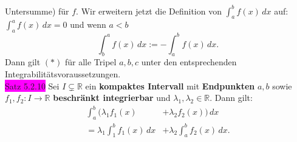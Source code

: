 \documentclass[landscape, 10pt]{article}
\newcommand{\R}{\mathbb{R}}
\begin{document}
\begin{multicols}{3}
{                     Untersumme)} für 
                     \textcolor{NavyBlue}{$f$}. Wir
                     erweitern jetzt die Definition von 
                     \textcolor{NavyBlue}{$\int_a^bf(x)\,dx$} 
                     auf: 
                     \textcolor{NavyBlue}{$\int_a^af(x)\,dx=0$} 
                     und wenn 
                     \textcolor{NavyBlue}{$a<b$}
                     \begin{equation*}
                            \int_b^af(x)\,dx
                            :=-\int_a^bf(x)\,dx.
                     \end{equation*}
                     Dann gilt $(*)$ für alle Tripel 
                     \textcolor{NavyBlue}{$a,b,c$} 
                     unter den entsprechenden 
                     Integrabilitätsvoraussetzungen. \\

              \colorbox{magenta}{Satz 5.2.10}
                     Sei \textcolor{NavyBlue}{$I\subsetneq\R$} 
                     ein \textbf{kompaktes Intervall} 
                     mit \textbf{Endpunkten} 
                     \textcolor{NavyBlue}{$a,b$} sowie 
                     \textcolor{NavyBlue}{
                     $f_1,f_2:I\longrightarrow\R$}
                     \textbf{beschränkt 
                     integrierbar} und 
                     \textcolor{NavyBlue}{
                     $\lambda_1,\lambda_2\in\R$}. 
                     Dann gilt: 
                     \begin{align*}
                            \int_a^b(\lambda_1f_1(x)
                            &+\lambda_2f_2(x))\,dx \\
                            =\lambda_1\int_1^bf_1(x)\,dx
                            &+\lambda_2\int_a^bf_2(x)\,dx.
                     \end{align*}

\end{multicols}
\end{document}
